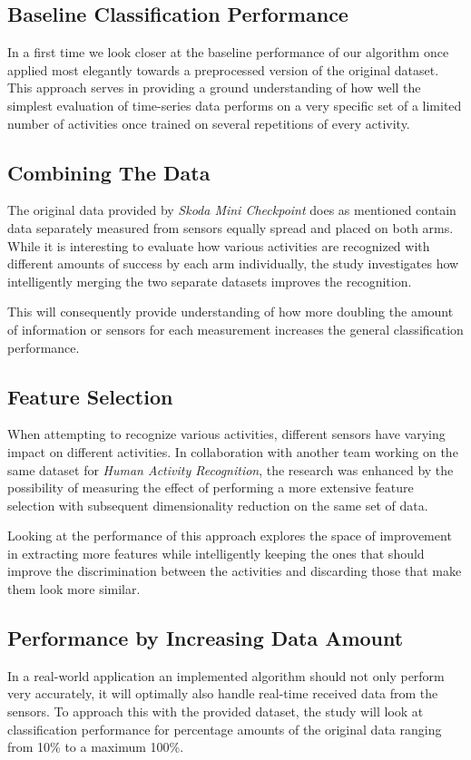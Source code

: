 \documentclass{sig-alternate}
\begin{document}
\subsection{Baseline Classification Performance}
In a first time we look closer at the baseline performance of our algorithm once applied most elegantly towards a preprocessed version of the original dataset. This approach serves in providing a ground understanding of how well the simplest evaluation of time-series data performs on a very specific set of a limited number of activities once trained on several repetitions of every activity.

\subsection{Combining The Data}
The original data provided by \textit{Skoda Mini Checkpoint} does as mentioned contain data separately measured from sensors equally spread and placed on both arms. While it is interesting to evaluate how various activities are recognized with different amounts of success by each arm individually, the study investigates how intelligently merging the two separate datasets improves the recognition. 

This will consequently provide understanding of how more doubling the amount of information or sensors for each measurement increases the general classification performance.

\subsection{Feature Selection}
When attempting to recognize various activities, different sensors have varying impact on different activities. In collaboration with another team working on the same dataset for \textit{Human Activity Recognition}, the research was enhanced by the possibility of measuring the effect of performing a more extensive feature selection with subsequent dimensionality reduction on the same set of data. 

Looking at the performance of this approach explores the space of improvement in extracting more features while intelligently keeping the ones that should improve the discrimination between the activities and discarding those that make them look more similar.

\subsection{Performance by Increasing Data Amount}
In a real-world application an implemented algorithm should not only perform very accurately, it will optimally also handle real-time received data from the sensors. To approach this with the provided dataset, the study will look at classification performance for percentage amounts of the original data ranging from 10\% to a maximum 100\%.
\end{document}
